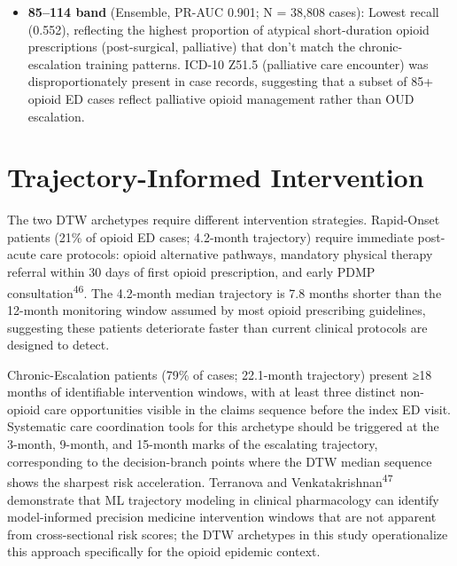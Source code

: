 \documentclass[
  12pt,
]{book}
\begin{document}
\begin{itemize}
  Beers Criteria-listed for falls risk in 65+) and tramadol (NDC
  65862-063-xx; CYP2D6 substrate) emerged as the leading risk
  combination, reflecting the shift from opioids for injury/pain to
  opioids as chronic multimodal analgesic in multimorbid elderly
  patients.
\item
  \textbf{85--114 band} (Ensemble, PR-AUC 0.901; N = 38,808 cases):
  Lowest recall (0.552), reflecting the highest proportion of atypical
  short-duration opioid prescriptions (post-surgical, palliative) that
  don't match the chronic-escalation training patterns. ICD-10 Z51.5
  (palliative care encounter) was disproportionately present in case
  records, suggesting that a subset of 85+ opioid ED cases reflect
  palliative opioid management rather than OUD escalation.
\end{itemize}

\section{Trajectory-Informed
Intervention}\label{trajectory-informed-intervention}

The two DTW archetypes require different intervention strategies.
Rapid-Onset patients (21\% of opioid ED cases; 4.2-month trajectory)
require immediate post-acute care protocols: opioid alternative
pathways, mandatory physical therapy referral within 30 days of first
opioid prescription, and early PDMP consultation\textsuperscript{46}.
The 4.2-month median trajectory is 7.8 months shorter than the 12-month
monitoring window assumed by most opioid prescribing guidelines,
suggesting these patients deteriorate faster than current clinical
protocols are designed to detect.

Chronic-Escalation patients (79\% of cases; 22.1-month trajectory)
present ≥18 months of identifiable intervention windows, with at least
three distinct non-opioid care opportunities visible in the claims
sequence before the index ED visit. Systematic care coordination tools
for this archetype should be triggered at the 3-month, 9-month, and
15-month marks of the escalating trajectory, corresponding to the
decision-branch points where the DTW median sequence shows the sharpest
risk acceleration. Terranova and Venkatakrishnan\textsuperscript{47}
demonstrate that ML trajectory modeling in clinical pharmacology can
identify model-informed precision medicine intervention windows that are
not apparent from cross-sectional risk scores; the DTW archetypes in
this study operationalize this approach specifically for the opioid
epidemic context.
\end{document}
